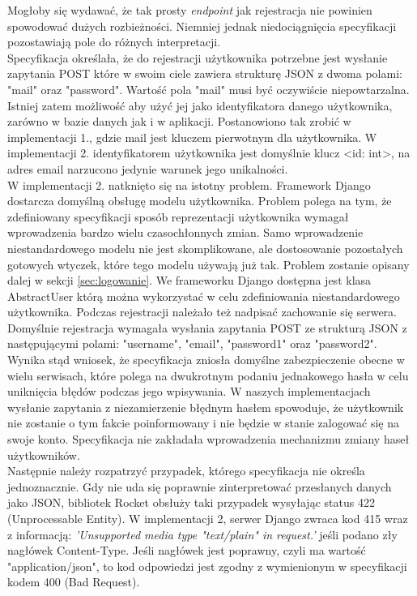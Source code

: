 \documentclass[12pt, notitlepage]{article}
\begin{document}
Mogłoby się wydawać, że tak prosty \textsl{endpoint} jak rejestracja nie powinien spowodować dużych rozbieżności. Niemniej jednak niedociągnięcia specyfikacji pozostawiają pole do różnych interpretacji.\\
Specyfikacja określała, że do rejestracji użytkownika potrzebne jest wysłanie zapytania POST które w swoim ciele zawiera strukturę JSON z dwoma polami: "mail" oraz "password". Wartość pola "mail" musi być oczywiście niepowtarzalna. Istniej zatem możliwość aby użyć jej jako identyfikatora danego użytkownika, zarówno w bazie danych jak i w aplikacji. Postanowiono tak zrobić w implementacji 1., gdzie mail jest kluczem pierwotnym dla użytkownika. W implementacji 2. identyfikatorem użytkownika jest domyślnie klucz <id: int>, na adres email narzucono jedynie warunek jego unikalności. \\
W implementacji 2. natknięto się na istotny problem. Framework Django dostarcza domyślną obsługę modelu użytkownika. Problem polega na tym, że zdefiniowany specyfikacji sposób reprezentacji użytkownika wymagał wprowadzenia bardzo wielu czasochłonnych zmian. Samo wprowadzenie niestandardowego modelu nie jest skomplikowane, ale dostosowanie pozostałych gotowych wtyczek, które tego modelu używają już tak. Problem zostanie opisany dalej w sekcji \ref{sec:logowanie}. We frameworku Django dostępna jest klasa AbstractUser którą można wykorzystać w celu zdefiniowania niestandardowego użytkownika. Podczas rejestracji należało też nadpisać zachowanie się serwera. Domyślnie rejestracja wymagała wysłania zapytania POST ze strukturą JSON z następującymi polami: "username", "email", "password1" oraz "password2". Wynika stąd wniosek, że specyfikacja zniosła domyślne zabezpieczenie obecne w wielu serwisach, które polega na dwukrotnym podaniu jednakowego hasła w celu uniknięcia błędów podczas jego wpisywania. W naszych implementacjach wysłanie zapytania z niezamierzenie błędnym hasłem spowoduje, że użytkownik nie zostanie o tym fakcie poinformowany i nie będzie w stanie zalogować się na swoje konto. Specyfikacja nie zakładała wprowadzenia mechanizmu zmiany haseł użytkowników. \\
Następnie należy rozpatrzyć przypadek, którego specyfikacja nie określa jednoznacznie. Gdy nie uda się poprawnie zinterpretować przesłanych danych jako JSON, bibliotek Rocket obsłuży taki przypadek wysyłając status 422 (Unprocessable Entity). W implementacji 2, serwer Django zwraca kod 415 wraz z informacją: \textit{'Unsupported media type "text/plain" in request.'} jeśli podano zły nagłówek Content-Type. Jeśli nagłówek jest poprawny, czyli ma wartość "application/json", to kod odpowiedzi jest zgodny z wymienionym w specyfikacji kodem 400 (Bad Request).  \\
\end{document}

